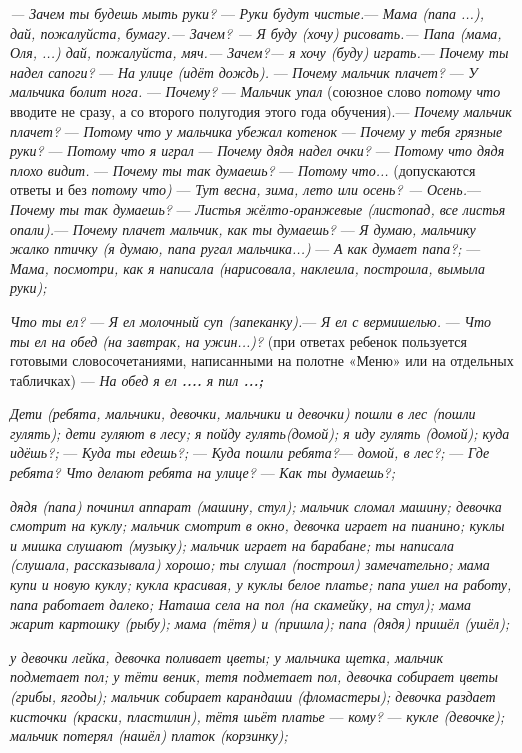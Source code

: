 \documentclass{book}
\renewcommand{\emph}[1]{\textit{#1}}
\begin{document}
\emph{--- Зачем ты будешь мыть руки?} --- \emph{Руки будут чистые.}---
\emph{Мама (папа ...), дай, пожалуйста, бумагу.--- Зачем? --- Я буду
(хочу) рисовать.--- Папа (мама, Оля, ...) дай, пожалуйста, мяч.---
Зачем?--- я хочу (буду) играть.}--- \emph{Почему ты надел сапоги?} ---
\emph{На улице (идёт дождь).} --- \emph{Почему мальчик плачет?} ---
\emph{У мальчика болит нога.} --- \emph{Почему?} --- \emph{Мальчик упал}
(союзное слово \emph{потому что} вводите не сразу, а со второго
полугодия этого года обучения).--- \emph{Почему мальчик плачет?} ---
\emph{Потому что у мальчика убежал котенок} --- \emph{Почему у тебя
грязные руки?} --- \emph{Потому что я играл} --- \emph{Почему дядя надел
очки?} --- \emph{Потому что дядя плохо видит.} --- \emph{Почему ты так
думаешь?} --- \emph{Потому что...} (допускаются ответы и без
\emph{потому что)} --- \emph{Тут весна, зима, лето или осень? ---
Осень.}--- \emph{Почему ты так думаешь?} --- \emph{Листья
жёлто-оранжевые (листопад, все листья опали).}--- \emph{Почему плачет
мальчик, как ты думаешь?} --- \emph{Я думаю, мальчику жалко птичку (я
думаю, папа ругал мальчика...)} --- \emph{А как думает папа?;} ---
\emph{Мама, посмотри, как я написала (нарисовала, наклеила, построила,
вымыла руки);}

\emph{Что ты ел?} --- \emph{Я ел молочный суп (запеканку).}--- \emph{Я
ел с вермишелью.} --- \emph{Что ты ел на обед (на завтрак, на ужин...)?}
(при ответах ребенок пользуется готовыми словосочетаниями, написанными
на полотне «Меню» или на отдельных табличках) --- \emph{На обед я ел
\textbf{....} я пил \textbf{...;}}

\emph{Дети (ребята, мальчики, девочки, мальчики и девочки) пошли в лес
(пошли гулять); дети гуляют в лесу; я пойду гулять(домой); я иду гулять
(домой); куда идёшь?;} --- \emph{Куда ты едешь?;} --- \emph{Куда пошли
ребята?}--- \emph{домой, в лес?;} --- \emph{Где ребята? Что делают
ребята на улице?} --- \emph{Как ты думаешь?;}

\emph{дядя (папа) починил аппарат (машину, стул); мальчик сломал машину;
девочка смотрит на куклу; мальчик смотрит в окно, девочка играет на
пианино; куклы и мишка слушают (музыку); мальчик играет на барабане; ты
написала (слушала, рассказывала) хорошо; ты слушал (построил)
замечательно; мама купи и новую куклу; кукла красивая, у куклы белое
платье; папа ушел на работу, папа работает далеко; Наташа села на пол
(на скамейку,} \emph{на стул); мама жарит картошку (рыбу); мама (тётя) и
(пришла); папа (дядя) пришёл (ушёл);}

\emph{у девочки лейка, девочка поливает цветы; у мальчика щетка, мальчик
подметает пол; у тёти веник, тетя подметает пол, девочка собирает цветы
(грибы, ягоды); мальчик собирает карандаши (фломастеры); девочка раздает
кисточки (краски, пластилин),} \emph{тётя шьёт платье} --- \emph{кому?}
--- \emph{кукле (девочке); мальчик потерял (нашёл) платок (корзинку);}
\end{document}
